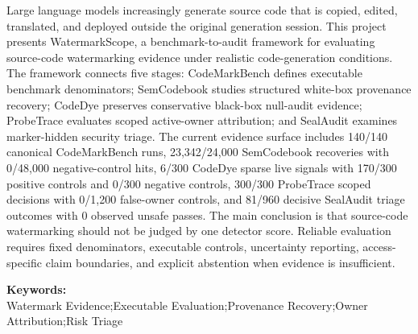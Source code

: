 Large language models increasingly generate source code that is copied, edited, translated, and deployed outside the original generation session. This project presents WatermarkScope, a benchmark-to-audit framework for evaluating source-code watermarking evidence under realistic code-generation conditions. The framework connects five stages: CodeMarkBench defines executable benchmark denominators; SemCodebook studies structured white-box provenance recovery; CodeDye preserves conservative black-box null-audit evidence; ProbeTrace evaluates scoped active-owner attribution; and SealAudit examines marker-hidden security triage. The current evidence surface includes 140/140 canonical CodeMarkBench runs, 23,342/24,000 SemCodebook recoveries with 0/48,000 negative-control hits, 6/300 CodeDye sparse live signals with 170/300 positive controls and 0/300 negative controls, 300/300 ProbeTrace scoped decisions with 0/1,200 false-owner controls, and 81/960 decisive SealAudit triage outcomes with 0 observed unsafe passes. The main conclusion is that source-code watermarking should not be judged by one detector score. Reliable evaluation requires fixed denominators, executable controls, uncertainty reporting, access-specific claim boundaries, and explicit abstention when evidence is insufficient.

\par\vspace{0.28em}\noindent\textbf{Keywords:}\\
Watermark Evidence;Executable Evaluation;Provenance Recovery;Owner Attribution;Risk Triage
